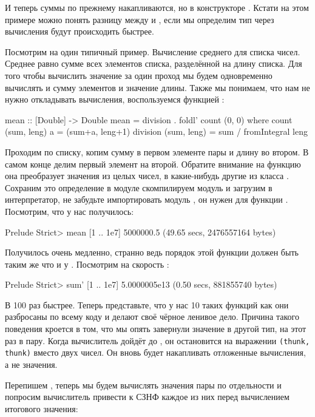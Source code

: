 И теперь суммы по прежнему накапливаются, но в 
конструкторе . Кстати на этом примере
можно понять разницу между  и ,
если мы определим тип  через 
вычисления будут происходить быстрее.

Посмотрим на один типичный пример. Вычисление среднего
для списка чисел. Среднее равно сумме всех элементов
списка, разделённой на длину списка. Для того
чтобы вычислить значение за один проход мы будем
одновременно вычислять и сумму элементов и значение
длины. Также мы понимаем, что нам не нужно откладывать
вычисления, воспользуемся функцией :

\begin{code}
mean :: [Double] -> Double
mean = division . foldl' count (0, 0)
    where count  (sum, leng) a = (sum+a, leng+1)
          division (sum, leng) = sum / fromIntegral leng
\end{code}

Проходим по списку, копим сумму в первом элементе пары и
длину во втором. В самом конце делим первый элемент на второй.
Обратите внимание на функцию  она преобразует
значения из целых чисел, в какие-нибудь другие из класса .
Сохраним это определение в модуле  скомпилируем
модуль и загрузим в интерпретатор, не забудьте импортировать
модуль , он нужен для функции . 
Посмотрим, что у нас получилось:


\begin{code}
Prelude Strict> mean [1 .. 1e7]
5000000.5
(49.65 secs, 2476557164 bytes)
\end{code}

Получилось очень медленно, странно ведь порядок этой функции
должен быть таким же что и у . Посмотрим на скорость :

\begin{code}
Prelude Strict> sum' [1 .. 1e7]
5.0000005e13
(0.50 secs, 881855740 bytes)
\end{code}

В 100 раз быстрее. Теперь представьте, что у нас 10 таких функций
как  они разбросаны по всему коду и делают своё чёрное 
ленивое дело. Причина такого поведения кроется в том, что мы
опять завернули значение в другой тип, на этот раз в пару.
Когда вычислитель дойдёт до , он остановится на 
выражении \verb!(thunk, thunk)! вместо двух чисел. Он вновь будет 
накапливать отложенные вычисления, а не значения.

Перепишем , теперь мы будем вычислять значения
пары по отдельности и попросим вычислитель привести
к СЗНФ каждое из них перед вычислением итогового значения:

